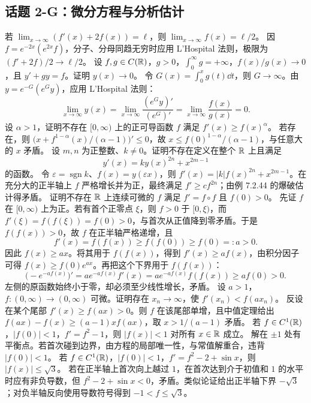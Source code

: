 \subsection*{话题 2-G：微分方程与分析估计}
若 $\lim_{x\to\infty}(f'(x)+2f(x))=\ell$，则 $\lim_{x\to\infty}f(x)=\ell/2$。
\pf 因 $f=e^{-2x}(e^{2x}f)$，分子、分母同趋无穷时应用 L'Hospital 法则，极限为 $(f'+2f)/2\to\ell/2$。
设 $f,g\in C(\mathbb R)$，$g>0$，$\int_0^\infty g=+\infty$，$f(x)/g(x)\to0$，且 $y'+gy=f$。证明 $y(x)\to0$。
\pf 令 $G(x)=\int_0^xg(t)\dd t$，则 $G\to\infty$。由 $y=e^{-G}(e^Gy)$，应用 L'Hospital 法则：
\[\lim_{x\to\infty}y(x)=\lim_{x\to\infty}\frac{(e^Gy)'}{(e^G)'}=\lim_{x\to\infty}\frac{f(x)}{g(x)}=0.\]
设 $\alpha>1$，证明不存在 $[0,\infty)$ 上的正可导函数 $f$ 满足 $f'(x)\ge f(x)^\alpha$。
\pf 若存在，则 $\bigl(x+f^{1-\alpha}(x)/(\alpha-1)\bigr)'\le0$，故 $x\le f(0)^{1-\alpha}/(\alpha-1)$，与任意大的 $x$ 矛盾。
设 $m,n$ 为正整数、$k\ne0$。证明不存在定义在整个 $\mathbb R$ 上且满足
\[y'(x)=k y(x)^{2n}+x^{2m-1}\]
的函数。
\pf 令 $\varepsilon=\operatorname{sgn}k$、$f(x)=y(\varepsilon x)$，则 $f'(x)=|k|f(x)^{2n}+x^{2m-1}$。在充分大的正半轴上 $f$ 严格增长并为正，最终满足 $f'\ge c f^{2n}$；由例 7.2.44 的爆破估计得矛盾。
证明不存在 $\mathbb R$ 上连续可微的 $f$ 满足 $f'=f\circ f$ 且 $f(0)>0$。
\pf 先证 $f$ 在 $[0,\infty)$ 上为正。若有首个正零点 $\xi$，则 $f>0$ 于 $[0,\xi)$，而 $f'(\xi)=f(f(\xi))=f(0)>0$，与首次从正值降到零矛盾。于是 $f(f(x))>0$，故 $f$ 在正半轴严格递增，且
\[f'(x)=f(f(x))\ge f(f(0))\ge f(0)=:a>0.\]
因此 $f(x)\ge ax$。将其用于 $f(f(x))$，得到 $f'(x)\ge a f(x)$，由积分因子可得 $f(x)\ge f(0)e^{ax}$。再把这个下界用于 $f(f(x))$：
\[\bigl(-e^{-af(x)}\bigr)'=ae^{-af(x)}f'(x)=ae^{-af(x)}f(f(x))\ge a f(0)>0.\]
左侧的原函数始终小于零，却必须至少线性增长，矛盾。
设 $a>1$，$f:(0,\infty)\to(0,\infty)$ 可微。证明存在 $x_n\to\infty$，使 $f'(x_n)<f(ax_n)$。
\pf 反设在某个尾部 $f'(x)\ge f(ax)>0$。则 $f$ 在该尾部单增，且中值定理给出 $f(ax)-f(x)\ge(a-1)x f(ax)$，取 $x>1/(a-1)$ 矛盾。
若 $f\in C^1(\mathbb R)$，$|f(0)|<1$，$f'=f^2-1$，则 $|f(x)|<1$ 对所有 $x\in\mathbb R$ 成立。
\pf 解在 $\pm1$ 处有平衡点。若首次碰到边界，由方程的局部唯一性，与常值解重合，违背 $|f(0)|<1$。
若 $f\in C^1(\mathbb R)$，$|f(0)|<1$，$f'=f^2-2+\sin x$，则 $|f(x)|\le\sqrt3$。
\pf 若在正半轴上首次向上越过 $1$，在首次达到介于初值和 $1$ 的水平时应有非负导数，但 $f^2-2+\sin x<0$，矛盾。类似论证给出正半轴下界 $-\sqrt3$；对负半轴反向使用导数符号得到 $-1<f\le\sqrt3$。
